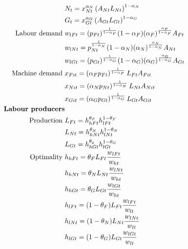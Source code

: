 \begin{align}
&N_t= x_{Nt}^{\alpha_N}\left(A_{Nt}L_{Nt}\right)^{1-\alpha_N}%
\label{mod:N}\\
&G_t=  x_{Gt}^{\alpha_G}\left(A_{Gt}L_{Gt}\right)^{1-\alpha_G} %
\label{mod:G}\\
\text{Labour demand}\ \vspace{4mm}%
& w_{lFt}=(p_{Ft})^\frac{1}{1-\alpha_F}(1-\alpha_F)(\alpha_F)^\frac{\alpha_F}{1-\alpha_F}A_{Ft}\nonumber\\
& w_{lNt}=p_{Nt}^\frac{1}{1-\alpha_N}(1-\alpha_N)(\alpha_N)^\frac{\alpha_N}{1-\alpha_N}A_{Nt}\nonumber\\
& w_{lGt}=(p_{Gt})^\frac{1}{1-\alpha_G}(1-\alpha_G)(\alpha_G)^\frac{\alpha_G}{1-\alpha_G}A_{Gt}\nonumber
\\
\text{Machine demand}\ \vspace{4mm}
&x_{Fit}= \left(\alpha_F p_{Ft}\right)^\frac{1}{1-\alpha_F}L_{Ft}A_{Fit}\nonumber\\
&x_{Nit}= \left(\alpha_N p_{Nt}\right)^\frac{1}{1-\alpha_N}L_{Nt}A_{Nit}\nonumber\\
&x_{Git}= \left(\alpha_G p_{Gt}\right)^\frac{1}{1-\alpha_G}L_{Gt}A_{Git}\nonumber
\\
\text{\textbf{Labour producers}}&\nonumber
\\
\text{Production}\ \vspace{4mm}& L_{Ft}=h_{hFt}^{\theta_{F}}h_{lFt}^{1-\theta_{F}}\label{mod:LF}\\
& L_{Nt}=h_{hNt}^{\theta_{N}}h_{lNt}^{1-\theta_{N}}\label{mod:LN}\\
& L_{Gt}=h_{hGt}^{\theta_{g}}h_{lGt}^{1-\theta_{G}}\label{mod:LG}\\
\text{Optimality}\ \vspace{4mm}& h_{hFt}= \theta_{F}L_{Ft}\frac{w_{lFt}}{w_{ht}}\nonumber\\ %
& h_{hNt}= \theta_{N}L_{Nt}\frac{w_{lNt}}{w_{ht}}\nonumber\\
& h_{hGt}= \theta_{G}L_{Gt}\frac{w_{lGt}}{w_{ht}}\nonumber\\
& h_{lFt}= (1-\theta_{F})L_{Ft}\frac{w_{lFt}}{w_{lt}}\nonumber\\%
& h_{lNt}= (1-\theta_{N}) L_{Nt}\frac{w_{lNt}}{w_{lt}}\nonumber\\
& h_{lGt}= (1-\theta_{G}) L_{Gt}\frac{w_{lGt}}{w_{lt}}\nonumber\\

\end{align}
